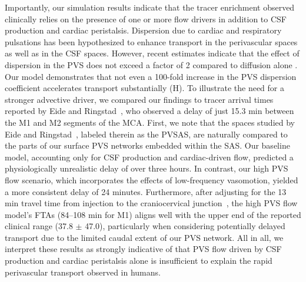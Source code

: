 \documentclass[fleqn,10pt]{wlscirep}
\begin{document}
Importantly, our simulation results indicate that the tracer
enrichment observed clinically relies on the presence of one or more
flow drivers in addition to CSF production and cardiac
peristalsis. Dispersion due to cardiac and respiratory pulsations has
been hypothesized to enhance transport in the perivascular spaces as
well as in the CSF spaces. However, recent estimates indicate that the
effect of dispersion in the PVS does not exceed a factor of 2 compared
to diffusion alone
\cite{asgari2016glymphatic,sharp2019dispersion,bojarskaite2023sleep,asgari2016glymphatic,troyetsky2021dispersion}. Our
model demonstrates that not even a 100-fold increase in the PVS
dispersion coefficient accelerates transport substantially
(H). To illustrate the need for a stronger advective
driver, we compared our findings to tracer arrival times reported by
Eide and Ringstad~\cite{eide2024functional}, who observed a delay of
just 15.3 min between the M1 and M2 segments of the MCA. First, we
note that the spaces studied by Eide and
Ringstad~\cite{eide2024functional}, labeled therein as the PVSAS, are
naturally compared to the parts of our surface PVS networks embedded
within the SAS. Our baseline model, accounting only for CSF production
and cardiac-driven flow, predicted a physiologically unrealistic delay
of over three hours. In contrast, our high PVS flow scenario, which
incorporates the effects of low-frequency vasomotion, yielded a more
consistent delay of 24 minutes. Furthermore, after adjusting for the
13 min travel time from injection to the craniocervical
junction~\cite{eide2024functional}, the high PVS flow model's FTAs
(84--108 min for M1) aligns well with the upper end of the reported
clinical range (37.8 $\pm$ 47.0), particularly when considering
potentially delayed transport due to the limited caudal extent of our
PVS network. All in all, we interpret these results as strongly
indicative of that PVS flow driven by CSF production and cardiac
peristalsis alone is insufficient to explain the rapid perivascular
transport observed in humans.
\end{document}
